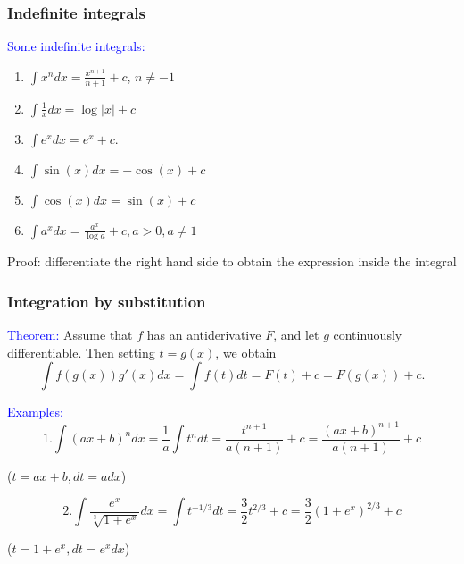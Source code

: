 \documentclass[11pt,aspectratio=169]{beamer}
\begin{document}
\begin{frame}
\frametitle{Indefinite integrals}
\begin{small}


\textcolor{blue}{Some indefinite integrals:}
\begin{enumerate}
\item $\int x^n dx =\frac{x^{n+1}}{n+1} +c$, $n \neq -1$  
\item $\int \frac{1}{x} dx=\log \vert x \vert +c$ 
\item $\int e^x dx= e^x +c$.
\item $\int \sin(x) dx=-\cos(x)+c \qquad $
\item $\int \cos(x) dx=\sin(x)+c$
\item $\int a^x dx=\frac{a^x}{\log a} +c, a>0, a \neq 1$

\end{enumerate}
\begin{tiny} Proof: differentiate the right hand side to obtain the expression  inside the integral \end{tiny}



\end{small}
\end{frame}

\begin{frame}
\frametitle{Integration by substitution}
\begin{small}
\textcolor{blue}{Theorem:} Assume that $f$ has an antiderivative $F$, and let $g$  continuously differentiable.
Then setting $t=g(x)$, we obtain 
$$
\int f(g(x)) g'(x) dx=\int f(t) dt=F(t)+c=F(g(x))+c.
$$

 \textcolor{blue}{Examples:}
$$
1. \int (ax+b)^n dx= \frac{1}{a} \int t^n dt=\frac{t^{n+1}}{a(n+1)}+c=\frac{(ax+b)^{n+1}}{a(n+1)}+c 
$$

\begin{tiny} ($t=ax+b, dt=adx$)\end{tiny}

$$
2. \int \frac{e^x}{\sqrt[3]{1+e^x}} dx=\int t^{-1/3} dt=\frac{3}{2} t^{2/3}+c=
\frac32 (1+e^x)^{2/3}+c 
$$

 \begin{tiny} ($t=1+e^x, dt=e^x dx$)\end{tiny}


\end{small}
\end{frame}
\end{document}
